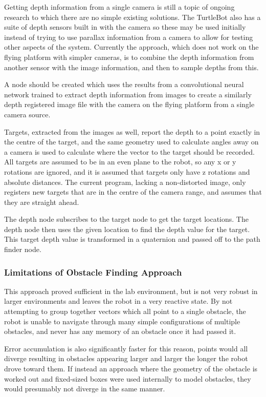 \documentclass{article}[12]
\begin{document}
	Getting depth information from a single camera is still a topic of ongoing research to which there are no simple existing solutions. The TurtleBot also has a suite of depth sensors built in with the camera so these may be used initially instead of trying to use parallax information from a camera to allow for testing other aspects of the system. Currently the approach, which does not work on the flying platform with simpler cameras, is to combine the depth information from another sensor with the image information, and then to sample depths from this.
	
	A node should be created which uses the results from a convolutional neural network trained to extract depth information from images to create a similarly depth registered image file with the camera on the flying platform from a single camera source.
	
	Targets, extracted from the images as well, report the depth to a point exactly in the centre of the target, and the same geometry used to calculate angles away on a camera is used to calculate where the vector to the target should be recorded. All targets are assumed to be in an even plane to the robot, so any x or y rotations are ignored, and it is assumed that targets only have z rotations and absolute distances. The current program, lacking a non-distorted image, only registers new targets that are in the centre of the camera range, and assumes that they are straight ahead.
 
 	The depth node subscribes to the target node to get the target locations. The depth node then uses the given location to find the depth value for the target. This target depth value is transformed in a quaternion and passed off to the path finder node. 
 
 \subsubsection{Limitations of Obstacle Finding Approach}
 
 This approach proved sufficient in the lab environment, but is not very robust in larger environments and leaves the robot in a very reactive state. By not attempting to group together vectors which all point to a single obstacle, the robot is unable to navigate through many simple configurations of multiple obstacles, and never has any memory of an obstacle once it had passed it. 
 
 Error accumulation is also significantly faster for this reason, points would all diverge resulting in obstacles appearing larger and larger the longer the robot drove toward them. If instead an approach where the geometry of the obstacle is worked out and fixed-sized boxes were used internally to model obstacles, they would presumably not diverge in the same manner. 
	
\end{document}
